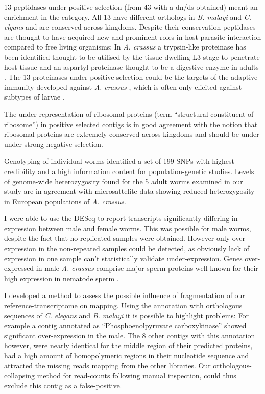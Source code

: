 13 peptidases under positive selection (from 43 with a dn/ds obtained)
meant an enrichment in the category. All 13 have different orthologs
in \textit{B. malayi} and \textit{C. elgans} and are conserved across
kingdoms. Despite their conservation peptidases are thought to have
acquired new and prominent roles in host-parasite interaction compared
to free living organisms: In \textit{A. crassus} a trypsin-like
proteinase has been identified thought to be utilised by the
tissue-dwelling L3 stage to penetrate host tissue and an aspartyl
proteinase thought to be a digestive enzyme in adults
\cite{polzer_identification_1993}. The 13 proteinases under positive
selection could be the targets of the adaptive immunity developed
against \textit{A. crassus} \cite{knopf_migratory_2008,
  knopf_vaccination_2008}, which is often only elicited against
subtypes of larvae \cite{molnar_caps}.

The under-representation of ribosomal proteins (term ``structural
constituent of ribosome'') in positive selected contigs is in good
agreement with the notion that ribosomal proteins are extremely
conserved across kingdoms \cite{pmid9664699} and should be under under
strong negative selection.

Genotyping of individual worms identified a set of 199
SNPs with highest credibility and a high information content for
population-genetic studies. Levels of genome-wide heterozygosity found
for the 5 adult worms examined in our study are in agreement with
microsattelite data \cite{wielgoss_population_2008} showing reduced
heterozygosity in European populations of \textit{A. crassus}.

I were able to use the DESeq \cite{pmid20979621} to report
transcripts significantly differing in expression between male and
female worms. This was possible for male worms, despite the fact that
no replicated samples were obtained. However only over-expression in
the non-repeated samples could be detected, as obviously lack of
expression in one sample can't statistically validate
under-expression. Genes over-expressed in male \textit{A. crassus}
comprise major sperm proteins well known for their high expression in
nematode sperm \cite{pmid15275275}.

I developed a method to assess the possible influence of
fragmentation of our reference-transcriptome on mapping. Using the
annotation with orthologous sequences of \textit{C. elegans} and
\textit{B. malayi} it is possible to highlight problems: For example a
contig annotated as ``Phosphoenolpyruvate carboxykinase'' showed
significant over-expression in the male. The 8 other contigs with this
annotation however, were nearly identical for the middle region of
their predicted proteins, had a high amount of homopolymeric regions in
their nucleotide sequence and attracted the missing reads mapping from
the other libraries. Our orthologous-collapsing method for read-counts
following manual inspection, could thus exclude this contig as a
false-positive.

